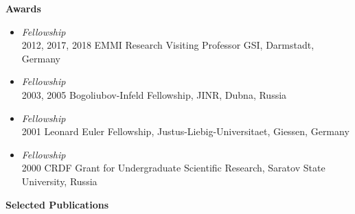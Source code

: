 \noindent\textbf{Awards} %
\begin{itemize}
	\item[] {\it Fellowship}\\ 
		2012, 2017, 2018  EMMI Research Visiting Professor GSI, Darmstadt, Germany
	\item []  {\it Fellowship}\\ 	
		2003, 2005 Bogoliubov-Infeld Fellowship, JINR, Dubna, Russia
	\item []  {\it Fellowship} 	\\ 
		2001 Leonard Euler Fellowship, Justus-Liebig-Universitaet, Giessen, Germany
	\item []  {\it Fellowship} 	\\ 
		2000 CRDF Grant for Undergraduate Scientific Research, Saratov State
University,  Russia
\end{itemize}

\vspace{0.6em}

\noindent\textbf{Selected Publications} %
\\

